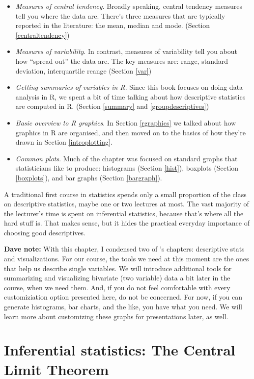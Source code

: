 \documentclass[
]{book}
\providecommand{\tightlist}{%
  \setlength{\itemsep}{0pt}\setlength{\parskip}{0pt}}
\begin{document}
\begin{itemize}
\tightlist
\item
  \emph{Measures of central tendency}. Broadly speaking, central tendency measures tell you where the data are. There's three measures that are typically reported in the literature: the mean, median and mode. (Section \ref{centraltendency})
\item
  \emph{Measures of variability}. In contrast, measures of variability tell you about how ``spread out'' the data are. The key measures are: range, standard deviation, interquartile reange (Section \ref{var})
\item
  \emph{Getting summaries of variables in R}. Since this book focuses on doing data analysis in R, we spent a bit of time talking about how descriptive statistics are computed in R. (Section \ref{summary} and \ref{groupdescriptives})
\item
  \emph{Basic overview to R graphics}. In Section \ref{rgraphics} we talked about how graphics in R are organised, and then moved on to the basics of how they're drawn in Section \ref{introplotting}.
\item
  \emph{Common plots}. Much of the chapter was focused on standard graphs that statisticians like to produce: histograms (Section \ref{hist}), boxplots (Section \ref{boxplots}), and bar graphs (Section \ref{bargraph}).
\end{itemize}

A traditional first course in statistics spends only a small proportion of the class on descriptive statistics, maybe one or two lectures at most. The vast majority of the lecturer's time is spent on inferential statistics, because that's where all the hard stuff is. That makes sense, but it hides the practical everyday importance of choosing good descriptives.

\textbf{Dave note:} With this chapter, I condensed two of \citet{Navarro2018}'s chapters: descriptive stats and visualizations. For our course, the tools we need at this moment are the ones that help us describe single variables. We will introduce additional tools for summarizing and visualizing bivariate (two variable) data a bit later in the course, when we need them. And, if you do not feel comfortable with every customiziation option presented here, do not be concerned. For now, if you can generate histograms, bar charts, and the like, you have what you need. We will learn more about customizing these graphs for presentations later, as well.

\hypertarget{inferential-statistics-the-central-limit-theorem}{%
\chapter{Inferential statistics: The Central Limit Theorem}\label{inferential-statistics-the-central-limit-theorem}}
\end{document}
